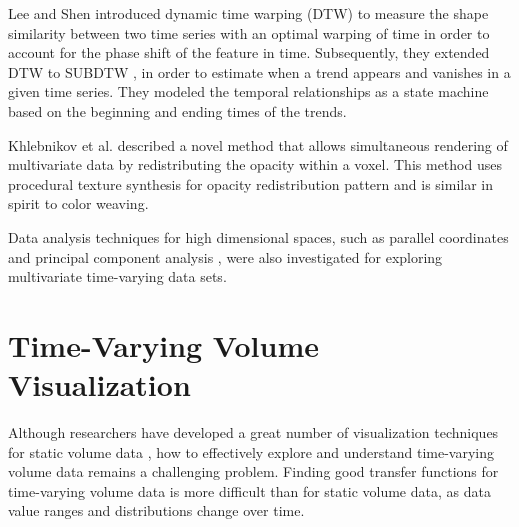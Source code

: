Lee and Shen \cite{lee_visualizing_2009} introduced dynamic time warping (DTW) to measure the shape similarity between two time series with an optimal warping of time in order to account for the phase shift of the feature in time. Subsequently, they extended DTW to SUBDTW \cite{lee_visualization_2009}, in order to estimate when a trend appears and vanishes in a given time series. They modeled the temporal relationships as a state machine based on the beginning and ending times of the trends.

Khlebnikov et al. \cite{khlebnikov_noise-based_2013} described a novel method that allows simultaneous rendering of multivariate data by redistributing the opacity within a voxel. This method uses procedural texture synthesis \cite{khlebnikov_procedural_2012} for opacity redistribution pattern and is similar in spirit to color weaving.

Data analysis techniques for high dimensional spaces, such as parallel coordinates \cite{akiba_visualizing_2007} \cite{guo_scalable_2012} and principal component analysis \cite{liu_multivariate_2014}, were also investigated for exploring multivariate time-varying data sets.


\section{Time-Varying Volume Visualization}
Although researchers have developed a great number of visualization techniques for static volume data \cite{pfister_transfer_2001}, how to effectively explore and understand time-varying volume data remains a challenging problem.
Finding good transfer functions for time-varying volume data is more difficult than for static volume data, as data value ranges and distributions change over time.

